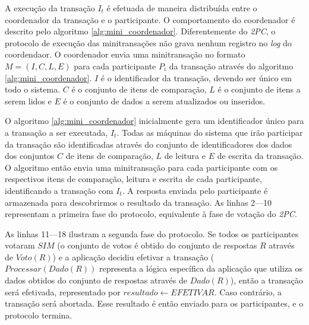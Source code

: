 \documentclass[11pt,twoside,a4paper]{book}
\begin{document}
A execução da transação \(I_t\) é efetuada de maneira distribuída entre o coordenador da transação e o participante. O comportamento do coordenador é descrito pelo algoritmo \ref{alg:mini_coordenador}. Diferentemente do \emph{2PC}, o protocolo de execução das minitransações não grava nenhum registro no \emph{log} do coordendaor. O coordenador envia uma minitransação no formato \(M = (I, C, L, E)\) para cada participante \(P_i\) da transação através do algoritmo \ref{alg:mini_coordenador}. $I$ é o identificador da transação, devendo ser único em todo o sistema. $C$ é o conjunto de itens de comparação, $L$ é o conjunto de itens a serem lidos e $E$ é o conjunto de dados a serem atualizados ou inseridos.

O algoritmo \ref{alg:mini_coordenador} inicialmente gera um identificador único para a transação a ser executada, $I_t$. Todas as máquinas do sistema que irão participar da transação são identificadas através do conjunto de identificadores dos dados dos conjuntos $C$ de itens de comparação, $L$ de leitura e $E$ de escrita da transação. O algoritmo então envia uma minitransação para cada participante com os respectivos itens de comparação, leitura e escrita de cada participante, identificando a transação com $I_t$. A resposta enviada pelo participante é armazenada para descobrirmos o resultado da transação. As linhas 2---10 representam a primeira fase do protocolo, equivalente à fase de votação do \emph{2PC}.

As linhas 11---18 ilustram a segunda fase do protocolo. Se todos os participantes votaram $SIM$ (o conjunto de votos é obtido do conjunto de respostas $R$ através de $Voto(R)$) e a aplicação decidiu efetivar a transação ($Processar(Dado(R))$ representa a lógica específica da aplicação que utiliza os dados obtidos do conjunto de respostas através de $Dado(R)$), então a transação será efetivada, representado por $resultado \gets EFETIVAR$. Caso contrário, a transação será abortada. Esse resultado é então enviado para os participantes, e o protocolo termina.


\end{document}

